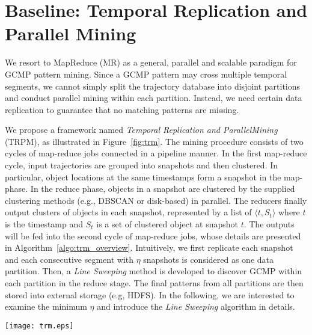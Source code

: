 \section{Baseline: Temporal Replication and Parallel Mining}
\label{sec:trm}
We resort to MapReduce (MR) as a general, parallel and scalable paradigm for GCMP pattern mining.
Since a GCMP pattern may cross multiple temporal segments, 
we cannot simply split the trajectory database into disjoint partitions and conduct parallel mining within each partition. Instead, we need certain data replication to guarantee that no matching patterns are missing.

We propose a framework named \emph{Temporal Replication and ParallelMining} (TRPM), 
as illustrated in Figure~\ref{fig:trm}. The mining procedure consists of 
two cycles of map-reduce jobs connected in a pipeline manner. In the first 
map-reduce cycle, input trajectories are grouped into snapshots and then clustered. 
In particular, object locations at the same timestamps form
a snapshot in the map-phase. In the reduce phase, objects in a snapshot
are clustered by the supplied clustering methods (e.g., DBSCAN or disk-based) in parallel.
The reducers finally output clusters of objects in each snapshot, 
represented by a list of $\langle t, S_t \rangle$ 
where $t$ is the timestamp and $S_t$ is a set of clustered object at snapshot $t$. 
The outputs will be fed into the second cycle of map-reduce jobs, whose details are presented in Algorithm~\ref{algo:trm_overview}. Intuitively, we first replicate each snapshot and each consecutive segment with $\eta$ snapshots is considered as one data partition. Then, a \emph{Line Sweeping} method is developed to discover GCMP within each partition in the reduce stage. The final patterns from all partitions are then stored into external storage (e.g, HDFS). In the following, we are interested to examine the minimum $\eta$ and introduce the \emph{Line Sweeping} algorithm in details.

\begin{figure*} [t]
\center
\texttt{[image: trm.eps]}
\caption{Work flow of Temporal Replication and Mining. (a)(b) correspond to the first map-reduce cycle which clusters objects in each snapshot;  (c)(d) correspond to the second map-reduce cycle which uses temporal replication to mine GCMP in parallel.}
\label{fig:trm}
\end{figure*}


